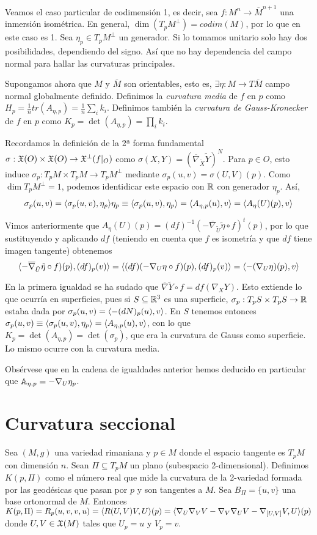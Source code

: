 \documentclass[GSR.tex]{subfiles}
\begin{document}
\begin{ej}
Veamos el caso particular de codimensión 1, es decir, sea $f:M^n\to \overline{M}^{n+1}$ una inmersión isométrica. En general, $\dim(T_pM^\perp)=codim(M)$, por lo que en este caso es 1. Sea $\eta_p\in T_pM^\perp$ un generador. Si lo tomamos unitario solo hay dos posibilidades, dependiendo del signo. Así que no hay dependencia del campo normal para hallar las curvaturas principales. 

Supongamos ahora que $M$ y $\overline{M}$ son orientables, esto es, $\exists\eta:M\to T\overline{M}$ campo normal globalmente definido. Definimos la \emph{curvatura media} de $f$ en $p$ como $H_p=\frac{1}{n}tr(A_{\eta,p})=\frac{1}{n}\sum_i k_i$. Definimos también la \emph{curvatura de Gauss-Kronecker} de $f$ en $p$ como $K_p=\det(A_{\eta,p})=\prod_i k_i$.

Recordamos la definición de la 2ª forma fundamental $\sigma:{\mathfrak{X}}(O)\times{\mathfrak{X}}(O)\to{\mathfrak{X}}^\perp(f|_O)$ como $\sigma(X,Y)=(\overline{\nabla}_{\tilde{X}}\tilde{Y})^N$. Para $p\in O$, esto induce $\sigma_p:T_pM\times T_pM\to T_pM^\perp$ mediante $\sigma_p(u,v)=\sigma(U,V)(p)$. Como $\dim T_pM^\perp=1$, podemos identidicar este espacio con $\mathbb{R}$ con generador $\eta_p$. Así, 
$$\sigma_p(u,v)=\langle{\sigma_p(u,v),\eta_p}\rangle\eta_p\equiv \langle{\sigma_p(u,v),\eta_p}\rangle=\langle{A_{\eta,p}(u),v}\rangle=\langle{A_\eta(U)(p),v}\rangle$$

Vimos anteriormente que $A_\eta(U)(p)=(df)^{-1}(-\overline{\nabla}_{\tilde{U}}\tilde{\eta}\circ f)^t(p)$, por lo que sustituyendo y aplicando $df$ (teniendo en cuenta que $f$ es isometría y que $df$ tiene imagen tangente) obtenemos
$$\langle{-\overline{\nabla}_{\tilde{U}}\tilde{\eta}\circ f)(p), (df)_p(v)}\rangle=\langle{(df)(-\nabla_{U}\eta\circ f)(p), (df)_p(v)}\rangle=\langle{-(\nabla_U\eta)(p),v}\rangle$$

En la primera igualdad se ha sudado que $\overline{\nabla}\tilde{Y}\circ f=df(\nabla_XY)$. Esto extiende lo que ocurría en superficies, pues si $S\subseteq\mathbb{R}^3$ es una superficie, $\sigma_p:T_pS\times T_pS\to \mathbb{R}$ estaba dada por $\sigma_p(u,v)=\langle{-(dN)_p(u),v}\rangle$. En $S$ tenemos entonces $\sigma_p(u,v)\equiv \langle{\sigma_p(u,v),\eta_p}\rangle=\langle{A_{\eta,p}(u),v}\rangle$, con lo que $K_p=\det(A_{\eta,p})=\det(\sigma_p)$, que era la curvatura de Gauss como superficie. Lo mismo ocurre con la curvatura media. 

Obsérvese que en la cadena de igualdades anterior hemos deducido en particular que $\mathbb{A}_{\eta,p}=-\nabla_U\eta_p$. 
\end{ej} 


\section{Curvatura seccional}
Sea $(M,g)$ una variedad rimaniana y $p\in M$ donde el espacio tangente es $T_pM$ con dimensión $n$. Sean $\Pi\subseteq T_pM$ un plano (subespacio 2-dimensional). Definimos $K(p,\Pi)$ como el número real que mide la curvatura de la 2-variedad formada por las geodésicas que pasan por $p$ y son tangentes a $M$. Sea $B_\Pi=\{u,v\}$ una base ortonormal de $M$. Entonces $K(p,\Pi)=R_p(u,v,v,u)=\langle{R(U,V)V,U}\rangle(p)=\langle{\nabla_U\nabla_VV-\nabla_V\nabla_UV-\nabla_{[U,V]}V,U}\rangle(p)$ donde $U,V\in{\mathfrak{X}}(M)$ tales que $U_p=u$ y $V_p=v$. 
\end{document}
